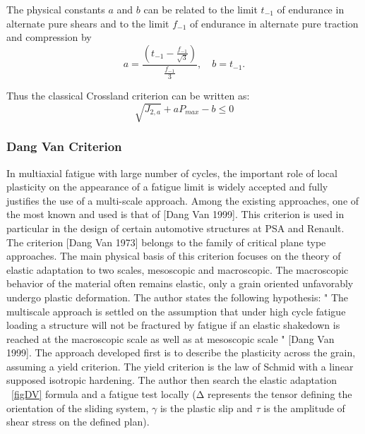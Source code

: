\documentclass[3p,times,procedia,number]{elsarticle}
\newcommand{\figref}[1]{\figurename~\ref{#1}}
\begin{document}
The physical constants $a$ and $b$ can be related to  the limit $t_{-1}$ of endurance in alternate pure shears and to the limit $f_{-1}$ of endurance in alternate pure traction and compression by
\begin{equation}
	a=\frac{(t_{-1}-\frac{f_{-1}}{\sqrt{3}})}{\frac{f_{-1}}{3}}, \quad 
	b=t_{-1}.
\end{equation}

Thus the classical Crossland criterion can be written as:
\begin{equation}
	\sqrt{J_{2,a}}+a{P_{max}}-b\leqslant 0
\end{equation}

\subsubsection{Dang Van Criterion}
In multiaxial fatigue with large number of cycles, the important role of local plasticity on the appearance of a fatigue limit is widely accepted and fully justifies the use of a multi-scale approach. Among the existing approaches, one of the most known and used is that of [Dang Van 1999]. This criterion is used in particular in the design of certain automotive structures at PSA and
Renault. The criterion [Dang Van 1973] belongs to the family of critical plane type approaches. The main physical
basis of this criterion focuses on the theory of elastic adaptation to two scales, mesoscopic and macroscopic. The macroscopic behavior of the material often remains elastic, only a grain oriented unfavorably undergo
plastic deformation. The author states the following hypothesis: " The
multiscale approach is settled on the assumption that under high cycle fatigue loading a structure
will not be fractured by fatigue if an elastic shakedown is reached at the macroscopic scale as well
as at mesoscopic scale " [Dang Van 1999]. The approach developed first is
to describe the plasticity across the grain, assuming a yield criterion. The yield criterion is the law of Schmid with a
linear supposed isotropic hardening. The author then search the elastic adaptation \figref{figDV} formula and a fatigue
test locally (Δ represents the tensor defining the orientation of the sliding system, $\gamma$ is the plastic slip  and $\tau$
is the amplitude of shear stress on the defined plan).
\end{document}
